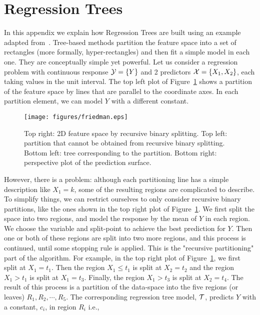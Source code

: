 \section{Regression Trees}
\label{A:RegTrees}
\textcolor[rgb]{0,0,1}{
In this appendix we explain how Regression Trees are built using an example adapted from~\cite{hastie2009elements}.
Tree-based methods partition the feature space into a set of rectangles (more formally, hyper-rectangles) and then fit a simple model in each one. They are conceptually simple yet powerful.
Let us consider a regression problem with continuous response $\mathcal{Y} = \{Y\}$ and 2 predictors $\mathcal{X} = \{X_1,X_2\}$, each taking values in the unit interval. The top left plot of Figure~\ref{fig:friedman} shows a partition of the feature space by lines that are parallel to the coordinate axes. In each partition element, we can model $Y$ with a different constant.
\begin{figure}
  \centering
  \texttt{[image: figures/friedman.eps]}
  \vspace{-8pt}
  \caption{Top right: 2D feature space by recursive binary splitting. Top left: partition that cannot be obtained from recursive binary splitting. Bottom left: tree corresponding to the partition. Bottom right:  perspective plot of the prediction surface.}
  \label{fig:friedman}
   \vspace{-10pt}
\end{figure} 
However, there is a problem: although each partitioning line has a simple description like $X_1 = k$, some of the resulting regions are complicated to describe.
To simplify things, we can restrict ourselves to only consider recursive binary partitions, like the ones shown in the top right plot of Figure~\ref{fig:friedman}.
We first split the space into two regions, and model the response by the mean of $Y$ in each region. 
We choose the variable and split-point to achieve the best prediction for $Y$. 
Then one or both of these regions are split into two more regions, and this process is continued, until some stopping rule is applied. This is the "recursive partitioning" part of the  algorithm. 
For example, in the top right plot of Figure~\ref{fig:friedman}, we first split at $X_1 = t_1$. 
Then the region $X_1 \leq t_1$ is split at $X_2 = t_2$ and the region $X_1 > t_1$ is split at $X_1 = t_3$.
Finally, the region $X_1 > t_3$ is split at $X_2 = t_4$. 
The result of this process is a partition of the data-space into the five regions (or leaves) $R_1, R_2,\cdots, R_5$.
The corresponding regression tree model, $\mathcal{T}$, predicts $Y$ with a constant, $c_i$, in region $R_i$ i.e.,
}
